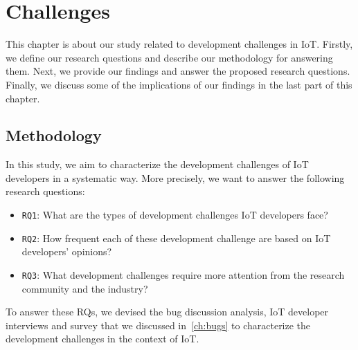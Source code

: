 
 
\chapter{Challenges}
\label{ch:Challenges}
This chapter is about our study related to development challenges in IoT. Firstly, we define our research questions and describe our methodology for answering them. Next, we provide our findings and answer the proposed research questions. Finally, we discuss some of the implications of our findings in the last part of this chapter.

\section{Methodology}
In this study, we aim to characterize the development challenges of IoT developers in a systematic way. More precisely, we want to answer the following research questions:
\begin{itemize}
\item {\verb|RQ1|}: What are the types of development challenges IoT developers face?
\item {\verb|RQ2|}: How frequent each of these development challenge are based on IoT developers' opinions?
\item {\verb|RQ3|}: What development challenges require more attention from the research community and the industry?
\end{itemize}

To answer these RQs, we devised the bug discussion analysis, IoT developer interviews and survey that we discussed in~\autoref{ch:bugs} to characterize the development challenges in the context of IoT. 


